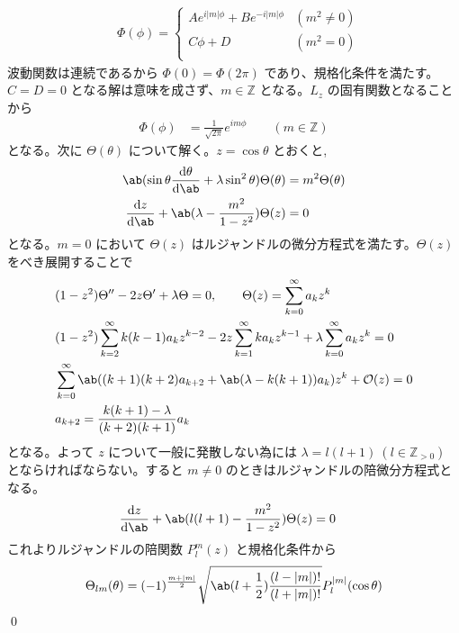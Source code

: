 \documentclass[uplatex,dvipdfmx,a4paper,11pt]{jlreq}
\makeatletter
\newcommand{\ZZ}{\mathbb{Z}}
\numberwithin{equation}{section}
\theoremstyle{definition}
\renewenvironment{proof}[1][\proofname]{\par
  \normalfont
  \topsep6\p@\@plus6\p@ \trivlist
  \item[\hskip\labelsep{\bfseries #1}\@addpunct{\bfseries}]\ignorespaces\quad\par
}{%
  \qed\endtrivlist\@endpefalse
}
\renewcommand\proofname{証明}
\makeatother
\begin{document}
\begin{proof}
\begin{align}
     & \Phi(\phi) = \begin{cases}
                      Ae^{i|m|\phi} + Be^{-i|m|\phi} & (m^2 \neq 0) \\
                      C\phi + D                      & (m^2 = 0)    \\
                    \end{cases}
  \end{align}
  波動関数は連続であるから $\Phi(0) = \Phi(2\pi)$ であり、規格化条件を満たす。$C = D = 0$ となる解は意味を成さず、$m\in\ZZ$ となる。$L_z$ の固有関数となることから
  \begin{align}
    \Phi(\phi) & = \frac{1}{\sqrt{2\pi}}e^{im\phi} \qquad (m\in\ZZ)
  \end{align}
  となる。次に $\Theta(\theta)$ について解く。$z = \cos\theta$ とおくと,
  \begin{align}
    \ab(\sin\theta\dv{\theta}\ab(\sin\theta\dv{\theta}) + \lambda \sin^2\theta)\Theta(\theta) & = m^2\Theta(\theta) \\
    \dv{z}\ab((1 - z^2)\dv{\Theta}{z}) + \ab(\lambda - \frac{m^2}{1 - z^2})\Theta(z)          & = 0
  \end{align}
  となる。$m = 0$ において $\Theta(z)$ はルジャンドルの微分方程式を満たす。$\Theta(z)$ をべき展開することで
  \begin{align}
     & (1 - z^2)\Theta'' - 2z\Theta' + \lambda\Theta = 0, \qquad \Theta(z) = \sum_{k = 0}^\infty a_kz^k                          \\
     & (1 - z^2)\sum_{k = 2}^\infty k(k-1)a_kz^{k-2} - 2z\sum_{k = 1}^\infty ka_kz^{k-1} + \lambda\sum_{k = 0}^\infty a_kz^k = 0 \\
     & \sum_{k = 0}^\infty \ab((k+1)(k+2)a_{k+2} + \ab(\lambda - k(k+1))a_k)z^k + \mathcal{O}(z) = 0                             \\
     & a_{k+2} = \frac{k(k+1) - \lambda}{(k+2)(k+1)}a_k
  \end{align}
  となる。よって $z$ について一般に発散しない為には $\lambda = l(l+1)\ (l\in\ZZ_{>0})$ とならければならない。すると $m\neq 0$ のときはルジャンドルの陪微分方程式となる。
  \begin{align}
    \dv{z}\ab((1 - z^2)\dv{\Theta}{z}) + \ab(l(l+1) - \frac{m^2}{1 - z^2})\Theta(z) & = 0
  \end{align}
  これよりルジャンドルの陪関数 $P_l^m(z)$ と規格化条件から
  \begin{align}
    \Theta_{lm}(\theta) & = (-1)^{\frac{m + |m|}{2}}\sqrt{\ab(l + \frac{1}{2})\frac{(l - |m|)!}{(l + |m|)!}}P_l^{|m|}(\cos\theta) \\

\end{align}
\end{proof}
\end{document}
